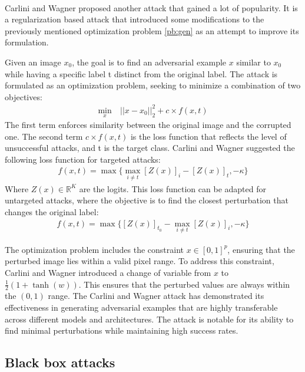\documentclass[10pt,twocolumn,letterpaper]{article}
\begin{document}
\paragraph{}
Carlini and Wagner proposed another attack \cite{robustness} that gained a lot of popularity. It is a regularization based attack that introduced some modifications to the previously mentioned optimization problem \ref{pb:gen} as an attempt to improve its formulation.

Given an image $x_0$, the goal is to find an adversarial example $x$ similar to $x_0$ while having a specific label t distinct from the original label. The attack is formulated as an optimization problem, seeking to minimize a combination of two objectives:
\begin{align*}
   \min_x &\ ||x - x_0||_2^2 + c \times f(x,t) %
\end{align*}
The first term enforces similarity between the original image and the corrupted one. The second term $ c \times f(x,t) $ is the loss function that reflects the level of unsuccessful attacks, and t is the target class. Carlini and Wagner suggested the following loss function for targeted attacks:
\begin{align*}
    f(x,t) = \max \{ \max_{i \neq t}[Z(x)]_i - [Z(x)]_t, -\kappa \}
\end{align*}
Where $Z(x) \in \mathbb{R}^K$ are the logits. 
This loss function can be adapted for untargeted attacks, where the objective is to find the closest perturbation that changes the original label:
\begin{align*}
    f(x,t) = \max \{[Z(x)]_{t_0} - \max_{i \neq t}[Z(x)]_i, -\kappa \}
\end{align*}

The optimization problem includes the constraint $ x \in [0,1]^p $, ensuring that the perturbed image lies within a valid pixel range. To address this constraint, Carlini and Wagner introduced a change of variable from $x$ to $\frac{1}{2} (1 + \tanh(w))$. 
This ensures that the perturbed values are always within the $(0,1)$ range.
The Carlini and Wagner attack has demonstrated its effectiveness in generating adversarial examples that are highly transferable across different models and architectures. The attack is notable for its ability to find minimal perturbations while maintaining high success rates.

\subsection{Black box attacks}
\end{document}
